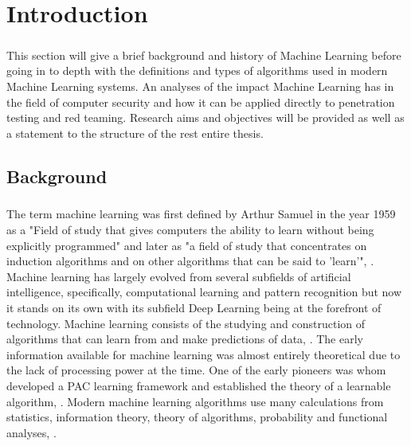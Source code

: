 \chapter{Introduction}
\label{chap:chapter1}


\paragraph{}This section will give a brief background and history of Machine Learning before going in to depth with the definitions and types of algorithms used in modern Machine Learning systems. An analyses of the impact Machine Learning has in the field of computer security and how it can be applied directly to penetration testing and red teaming. Research aims and objectives will be provided as well as a statement to the structure of the rest entire thesis.



\section{Background}
\label{sec:section1}

\paragraph{}The term machine learning was first defined by Arthur Samuel in the year 1959 as a "Field of study that gives computers the ability to learn without being explicitly programmed" and later as "a field of study that concentrates on induction algorithms and on other algorithms that can be said to 'learn'", \cite{ronKohavi}. Machine learning has largely evolved from several subfields of artificial intelligence, specifically, computational learning and pattern recognition but now it stands on its own with its subfield Deep Learning being at the forefront of technology. Machine learning consists of the studying and construction of algorithms that can learn from and make predictions of data, \cite{bigData}. The early information available for machine learning was almost entirely theoretical due to the lack of processing power at the time. One of the early pioneers was \cite{Valiant} whom developed a PAC learning framework and established the theory of a learnable algorithm, \cite{mlOpt}.  Modern machine learning algorithms use many calculations from statistics, information theory, theory of algorithms, probability and functional analyses, \cite{mlOpt}.

